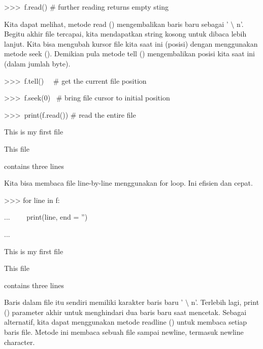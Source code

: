 \vspace{12pt}
\noindent 
>>>~f.read()   $  \#  $ further reading returns empty sting \par
\vspace{12pt}
Kita dapat melihat, metode read () mengembalikan baris baru sebagai ' $  \setminus  $ n'. Begitu akhir file tercapai, kita mendapatkan string kosong untuk dibaca lebih lanjut. Kita bisa mengubah kursor file kita saat ini (posisi) dengan menggunakan metode seek (). Demikian pula metode tell () mengembalikan posisi kita saat ini (dalam jumlah byte). \par
\vspace{12pt}
\noindent 
>>>~f.tell()~~   $  \#  $ get the current file position \par
{} \par
\vspace{12pt}
\noindent 
>>>~f.seek(0)~   $  \#  $ bring file cursor to initial position \par
{} \par
\vspace{12pt}
\noindent 
>>>~print(f.read())   $  \#  $ read the entire file \par
\noindent 
This is my first file \par
\noindent 
This file \par
\noindent 
contains three lines \par
\vspace{12pt}
\vspace{12pt}
\noindent 
Kita bisa membaca file line-by-line menggunakan for loop. Ini efisien dan cepat. \par
\vspace{12pt}
\noindent 
>>> for line in f: \par
\noindent 
...~~~~ print(line, end = '') \par
\noindent 
... \par
\noindent 
This is my first file \par
\noindent 
This file \par
\noindent 
contains three lines \par
Baris dalam file itu sendiri memiliki karakter baris baru ' $  \setminus  $ n'. Terlebih lagi, print () parameter akhir untuk menghindari dua baris baru saat mencetak. Sebagai alternatif, kita dapat menggunakan metode readline () untuk membaca setiap baris file. Metode ini membaca sebuah file sampai newline, termasuk newline character. \par
\vspace{12pt}
